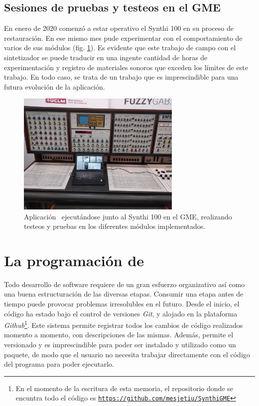 \subsection{Sesiones de pruebas y testeos en el GME}

En enero de 2020 comenzó a estar operativo el Synthi 100 en su proceso de restauración. En ese mismo mes pude experimentar con el comportamiento de varios de sus módulos (fig. \ref{fig:Synthi_Synthi}). Es evidente que este trabajo de campo con el sintetizador se puede traducir en una ingente cantidad de horas de experimentación y registro de materiales sonoros que exceden los límites de este trabajo. En todo caso, se trata de un trabajo que es imprescindible para una futura evolución de la aplicación.

\begin{figure}
	\centering
	\includegraphics[width=0.7\textwidth]{Synthi_Synthi}
	\caption[Aplicación \appName~ejecutándose junto al Synthi 100 en el GME]{Aplicación \appName~ejecutándose junto al Synthi 100 en el GME, realizando testeos y pruebas en los diferentes módulos implementados.}
	\label{fig:Synthi_Synthi}
\end{figure}

\section[La programación\dots]{La programación de \appName {}}

Todo desarrollo de software requiere de un gran esfuerzo organizativo así como una buena estructuración de las diversas etapas. Consumir una etapa antes de tiempo puede provocar problemas irresolubles en el futuro. Desde el inicio, el código ha estado bajo el control de versiones \textit{Git}, y alojado en la plataforma \textit{Github}\footnote{En el momento de la escritura de esta memoria, el repositorio donde se encuntra todo el código es \href{https://github.com/mesjetiu/SynthiGME}{\texttt{https://github.com/mesjetiu/SynthiGME}}}. Este sistema permite registrar todos los cambios de código realizados momento a momento, con descripciones de las mismas. Además, permite el versionado y es imprescindible para poder ser instalado y utilizado como un paquete, de modo que el usuario no necesita trabajar directamente con el código del programa para poder ejecutarlo.

